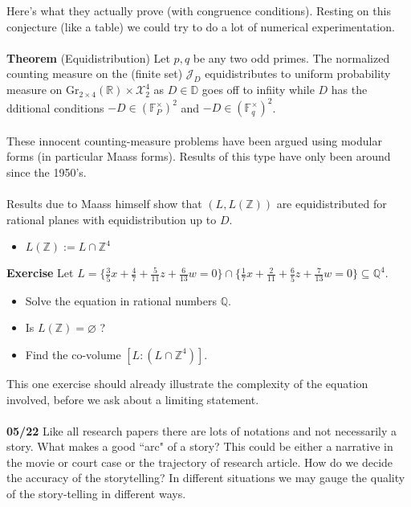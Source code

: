 \documentclass[12pt]{article}
\begin{document}
{\begin{itemize}
\end{itemize}
Here's what they actually prove (with congruence conditions).  Resting on this conjecture (like a table) we could try to do a lot of numerical experimentation. \\ \\
\textbf{Theorem} (Equidistribution) Let $p,q$ be any two odd primes.  The normalized counting measure on the (finite set) $\mathcal{J}_D$ equidistributes to uniform probability measure on 
$ \text{Gr}_{2 \times 4} (\mathbb{R}) \times \mathcal{X}_2^4$ 
as $D \in \mathbb{D}$ goes off to infiity while $D$ has the dditional conditions $-D \in (\mathbb{F}_P^\times)^2$ and $-D \in (\mathbb{F}_q^\times)^2$.  \\ \\
These innocent counting-measure problems have been argued using modular forms (in particular Maass forms).  Results of this type have only been around since the 1950's.   \\ \\
Results due to Maass himself show that $(L, L(\mathbb{Z})) $ are equidistributed for rational planes with equidistribution up to $D$. 
\begin{itemize}
\item $L(\mathbb{Z}):= L \cap \mathbb{Z}^4$
\end{itemize}
\textbf{Exercise} Let $L = \{ \frac{3}{5}x + \frac{4}{7} + \frac{5}{11}z + \frac{6}{13}w = 0  \}\cap \{ \frac{1}{7}x + \frac{2}{11} + \frac{6}{5}z + \frac{7}{13}w = 0  \}\subseteq \mathbb{Q}^4$. 
\begin{itemize}
\item Solve the equation in rational numbers $\mathbb{Q}$.
\item  Is $L(\mathbb{Z}) = \varnothing$ ? 
\item Find the co-volume $[L: (L \cap \mathbb{Z}^4)]$.
\end{itemize}
This one exercise should already illustrate the complexity of the equation involved, before we ask about a limiting statement. \\ \\
\noindent \textbf{05/22} Like all research papers there are lots of notations and not necessarily a story.  What makes a good ``arc" of a story? This could be either a narrative in the movie or court case or the trajectory of research article.  How do we decide the accuracy of the storytelling?  In different situations we may gauge the quality of the story-telling in different ways.  \\ \\ 
}
\end{document}
